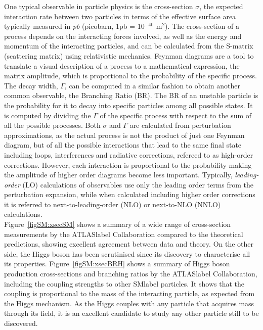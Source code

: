 One typical observable in particle physics is the cross-section $\sigma$, the expected interaction rate between two particles in terms of the effective surface area typically measured in \textit{pb} (picobarn, 1pb = 10$^{-40}$ m$^2$). The cross-section of a process depends on the interacting forces involved, as well as the energy and momentum of the interacting particles, and can be calculated from the S-matrix (scattering matrix) using relativistic mechanics. Feynman diagrams are a tool to translate a visual description of a process to a mathematical expression, the matrix amplitude, which is proportional to the probability of the specific process.\\

The decay width, $\Gamma$, can be computed in a similar fashion to obtain another common observable, the Branching Ratio (BR). The BR of an unstable particle is the probability for it to decay into specific particles among all possible states. It is computed by dividing the $\Gamma$ of the specific process with respect to the sum of all the possible processes. Both $\sigma$ and $\Gamma$ are calculated from perturbation approximations, as the actual process is not the product of just one Feynman diagram, but of all the possible interactions that lead to the same final state including loops, interferences and radiative corrections, refereed to as high-order corrections. However, each interaction is proportional to the probability making the amplitude of higher order diagrams become less important. Typically, \textit{leading-order} (LO) calculations of observables use only the leading order terms from the perturbation expansion, while when calculated including higher order corrections it is referred to next-to-leading-order (NLO) or next-to-NLO (NNLO) calculations.\\

Figure~\ref{figSM:xsecSM} shows a summary of a wide range of cross-section measurements by the \acrshort{ATLASlabel} Collaboration compared to the theoretical predictions, showing excellent agreement between data and theory. On the other side, the Higgs boson has been scrutinised since its discovery to characterise all its properties. Figure~\ref{figSM:xsecBRH} shows a summary of Higgs boson production cross-sections and branching ratios by the \acrshort{ATLASlabel} Collaboration, including the coupling strengths to other \acrshort{SMlabel} particles. It shows that the coupling is proportional to the mass of the interacting particle, as expected from the Higgs mechanism. As the Higgs couples with any particle that acquires mass through its field, it is an excellent candidate to study any other particle still to be discovered.\\

